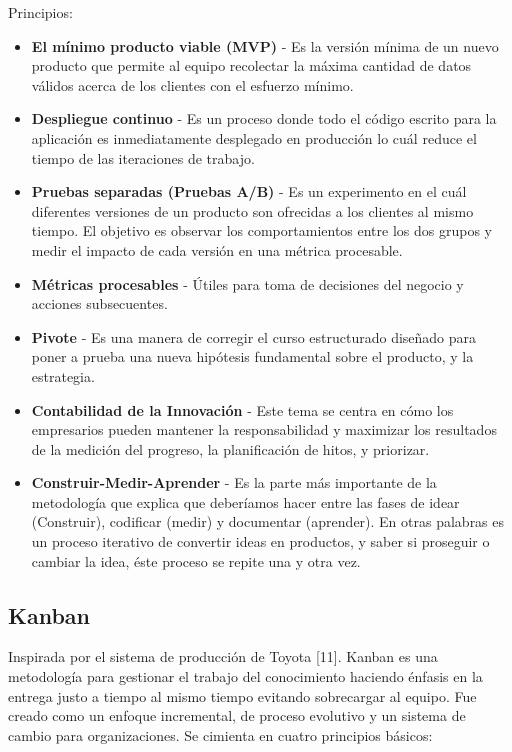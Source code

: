 \documentclass[conference]{IEEEtran}
\begin{document}
Principios:

\begin{itemize}
 \item {\bf El mínimo producto viable (MVP)} - Es la versión mínima de un nuevo producto que permite al equipo recolectar la máxima cantidad de datos válidos acerca de los clientes con el esfuerzo mínimo. 
 \item {\bf Despliegue continuo} - Es un proceso donde todo el código escrito para la aplicación es inmediatamente desplegado en producción lo cuál reduce el tiempo de las iteraciones de trabajo.
 \item {\bf Pruebas separadas (Pruebas A/B)} -  Es un experimento en el cuál diferentes versiones de un producto son ofrecidas a los clientes al mismo tiempo. El objetivo es observar los comportamientos entre los dos grupos y medir el impacto de cada versión en una métrica procesable.
 \item {\bf Métricas procesables} - Útiles para toma de decisiones del negocio y acciones subsecuentes.
 \item {\bf Pivote} - Es una manera de corregir el curso estructurado diseñado para poner a prueba una nueva hipótesis fundamental sobre el producto, y la estrategia.
 \item {\bf Contabilidad de la Innovación} - Este tema se centra en cómo los empresarios pueden mantener la responsabilidad y maximizar los resultados de la medición del progreso, la planificación de hitos, y priorizar.
 \item {\bf Construir-Medir-Aprender} - Es la parte más importante de la metodología que explica que deberíamos hacer entre las fases de idear (Construir), codificar (medir) y documentar (aprender). En otras palabras es un proceso iterativo de convertir ideas en productos, y saber si proseguir o cambiar la idea, éste proceso se repite una y otra vez.
\end{itemize}

\subsection{Kanban}

Inspirada por el sistema de producción de Toyota [11]. Kanban es una metodología para gestionar el trabajo del conocimiento haciendo énfasis en la entrega justo a tiempo al mismo tiempo evitando sobrecargar al equipo. Fue creado como un enfoque incremental, de proceso evolutivo y un sistema de cambio para organizaciones.  Se cimienta en cuatro principios básicos:
\end{document}
